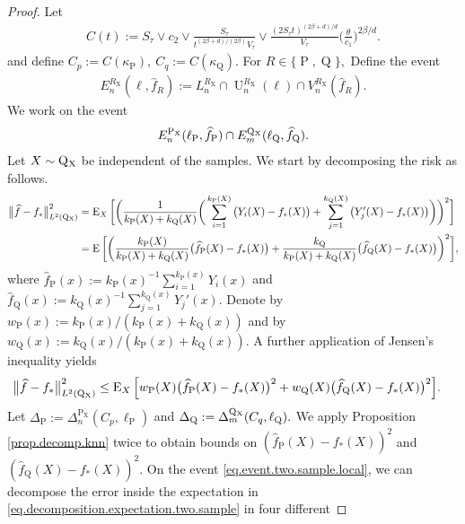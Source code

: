 \documentclass[10pt]{article}
\newcommand{\E}{\operatorname{E}}
\renewcommand{\P}{\operatorname{P}}
\newcommand{\Q}{\operatorname{Q}}
\newcommand{\U}{\operatorname{U}}
\renewcommand{\k}{\kappa}
\newcommand{\wh}{\widehat}
\newcommand{\sX}{\mathrm{X}}
\begin{document}
\begin{proof}
    Let 
    \begin{align*}
        C(t) := S_\tau\vee c_2 \vee \frac{S_\tau}{t^{(2\beta + d)/(2\beta)}V_\tau} \vee \frac{(2S_\tau t)^{(2\beta + d)/d}}{V_\tau}\bigg(\frac{\theta}{c_1}\bigg)^{2\beta/d}.
    \end{align*}
    and define $C_p := C(\k_{\P}), \ C_q := C(\k_{\Q}).$ For $R \in \{\P, \Q\},$ Define the event
    \begin{align*}
        E_n^{R_{\sX}}(\ell, \wh f_R) := L_n^{R_{\sX}} \cap \U_n^{R_{\sX}}(\ell) \cap V_n^{R_{\sX}}(\wh f_R).
    \end{align*}
    We work on the event
    \begin{align}
        \label{eq.event.two.sample.local}
        E_n^{\P_{\sX}}(\ell_{\P}, \wh f_{\P}) \cap E_m^{\Q\mathstrut_{\!\sX}}(\ell_{\Q}, \wh f_{\Q}).
    \end{align}
   Let $X \sim \Q\mathstrut_{\!\sX}$ be independent of the samples. We start by decomposing the risk as follows.
    \begin{align*}
        \big\|\wh f - f_*\big\|_{L^2(\Q\mathstrut_{\!\sX})}^2 &= \E_X\bigg[\bigg(\frac{1}{k_{\P}(X) + k_{\Q}(X)}\bigg(\sum_{i=1}^{k_{\P}(X)}\big(Y_i(X) - f_*(X)\big) + \sum_{j=1}^{k_{\Q}(X)} \big(Y_j'(X) - f_*(X)\big)\bigg)\bigg)^2\bigg]\\
        &= \E\bigg[\bigg(\frac{k_{\P}(X)}{k_{\P}(X) + k_{\Q}(X)}\big(\wh f_{\P}(X) - f_*(X)\big) + \frac{k_{\Q}}{k_{\P}(X) + k_{\Q}(X)}\big(\wh f_{\Q}(X) - f_*(X)\big)\bigg)^2\bigg],
    \end{align*}
    where $\wh f_{\P}(x) := k_{\P}(x)^{-1}\sum_{i=1}^{k_{\P}(x)} Y_i(x)$ and $\wh f_{\Q}(x) := k_{\Q}(x)^{-1}\sum_{j=1}^{k_{\Q}(x)} Y_j'(x).$ Denote by $w_{\P}(x) := k_{\P}(x)/(k_{\P}(x) + k_{\Q}(x))$ and by $w_{\Q}(x) := k_{\Q}(x)/(k_{\P}(x) + k_{\Q}(x)).$ A further application of Jensen's inequality yields
    \begin{align}
        \label{eq.decomposition.expectation.two.sample}
        \big\|\wh f - f_*\big\|_{L^2(\Q\mathstrut_{\!\sX})}^2 &\leq \E_X\Big[w_{\P}(X)\big(\wh f_{\P}(X) - f_*(X)\big)^2 + w_{\Q}(X) \big(\wh f_{\Q}(X) - f_*(X)\big)^2\Big].
    \end{align}
    Let $\Delta_{\P} := \Delta_n^{\P_{\sX}}(C_p, \ell_{\P})$ and $\Delta_{\Q} := \Delta_m^{\Q\mathstrut_{\!\sX}}(C_q, \ell_{\Q}).$ We apply Proposition \ref{prop.decomp.knn} twice to obtain bounds on $(\wh f_{\P}(X) - f_*(X))^2$ and $(\wh f_{\Q}(X) - f_*(X))^2.$ On the event \eqref{eq.event.two.sample.local}, we can decompose the error inside the expectation in \eqref{eq.decomposition.expectation.two.sample} in four different

\end{proof}
\end{document}
